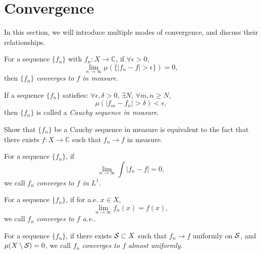 \section{Convergence}
\begin{rem}
    In this section, we will introduce multiple modes of convergence, 
    and discuss their relationships.
\end{rem}
\begin{defn}
    \label{Defn:ConvergeInMeasure}
    For a sequence $\{f_{n}\}$ with $f_{n}:X\rightarrow\mathbb{C}$, 
    if $\forall\epsilon>0$, 
    \begin{displaymath}
        \lim_{n\rightarrow\infty}\mu(\{|f_n-f|>\epsilon\})=0,
    \end{displaymath}
    then $\{f_n\}$ \textit{converges to $f$ in measure.}
\end{defn}
\begin{defn}
    \label{Defn:CauchyInMeasure}
    If a sequence $\{f_{n}\}$ satisfies: $\forall\epsilon,\delta>0$, 
    $\exists N$, $\forall m,n\ge N$, 
    \begin{displaymath}
        \mu(|f_{m}-f_{n}|>\delta)<\epsilon,
    \end{displaymath}
    then $\{f_{n}\}$ is called a \textit{Cauchy sequence in measure}.
\end{defn}
\begin{exc}
    Show that $\{f_{n}\}$ be a Cauchy sequence in measure 
    is equivalent to the fact that 
    there exists $f:X\rightarrow\mathbb{C}$ such that 
    $f_{n}\rightarrow f$ in measure.
\end{exc}
\begin{defn}
    \label{Defn:ConvergenceInL1}
    For a sequence $\{f_n\}$, if 
    \begin{displaymath}
        \lim_{n\rightarrow\infty}\int|f_n-f|=0,
    \end{displaymath}
    we call $f_{n}$ \textit{converges to $f$ in $L^{1}$.}
\end{defn}
\begin{defn}
    \label{Defn:ConvergeAlmostEverywhere}
    For a sequence $\{f_n\}$, if for a.e. $x\in X$, 
    \begin{displaymath}
        \lim_{n\rightarrow\infty}f_{n}(x)=f(x),
    \end{displaymath}
    we call $f_{n}$ \textit{converges to $f$ a.e..}
\end{defn}
\begin{defn}
    \label{Defn:AlmostConvergesUniformly}
    For a sequence $\{f_n\}$, if there exists $\mathcal{S}\subset X$ 
    such that 
    $f_{n}\rightarrow f$ uniformly on $\mathcal{S}$, 
    and $\mu(X\setminus\mathcal{S})=0$, 
    we call $f_{n}$ \textit{converges to $f$ almost uniformly}.
\end{defn}
